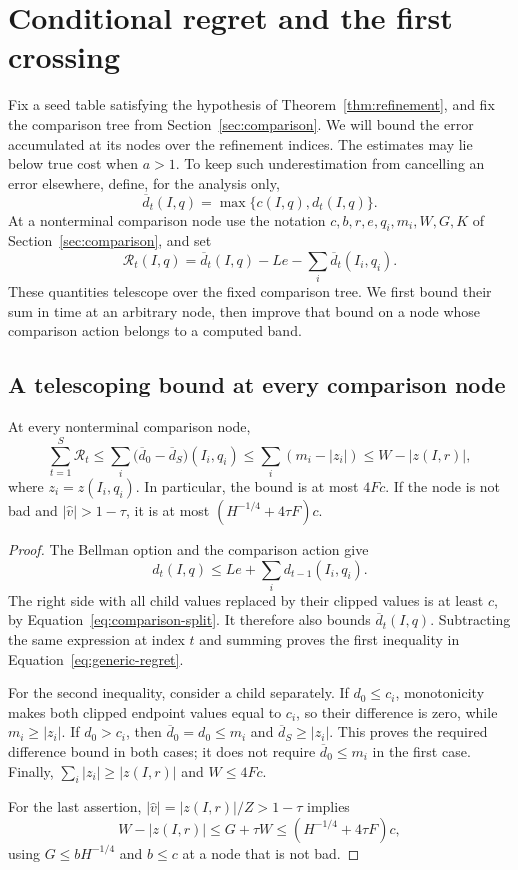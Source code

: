 \section{Conditional regret and the first crossing}\label{sec:regret}

Fix a seed table satisfying the hypothesis of Theorem~\ref{thm:refinement},
and fix the comparison tree from Section~\ref{sec:comparison}.
We will bound the error accumulated at its nodes over the refinement indices.
The estimates may lie below true cost when $a>1$. To keep such
underestimation from cancelling an error elsewhere, define, for the analysis
only,
\[
 \overline d_t(I,q)=\max\{c(I,q),d_t(I,q)\}.
\]
At a nonterminal comparison node use the notation
$c,b,r,e,q_i,m_i,W,G,K$ of Section~\ref{sec:comparison}, and set
\begin{equation}\label{eq:node-regret-definition}
 \mathcal R_t(I,q)
 =\overline d_t(I,q)-Le-\sum_i\overline d_t(I_i,q_i).
\end{equation}
These quantities telescope over the fixed comparison tree. We first bound
their sum in time at an arbitrary node, then improve that bound on a node
whose comparison action belongs to a computed band.

\subsection{A telescoping bound at every comparison node}

\begin{lemma}\label{lem:generic-regret}
At every nonterminal comparison node,
\begin{equation}\label{eq:generic-regret}
 \sum_{t=1}^S\mathcal R_t
 \le \sum_i\bigl(\overline d_0-\overline d_S\bigr)(I_i,q_i)
 \le \sum_i(m_i-|z_i|)
 \le W-|z(I,r)|,
\end{equation}
where $z_i=z(I_i,q_i)$. In particular, the bound is at most $4Fc$.
If the node is not bad and $|\widehat v|>1-\tau$, it is at most
$(H^{-1/4}+4\tau F)c$.
\end{lemma}

\begin{proof}
The Bellman option and the comparison action give
\[
 d_t(I,q)\le Le+\sum_i d_{t-1}(I_i,q_i).
\]
The right side with all child values replaced by their clipped values is
at least $c$, by Equation~\ref{eq:comparison-split}. It therefore also bounds
$\overline d_t(I,q)$. Subtracting the same expression at index $t$ and
summing proves the first inequality in Equation~\ref{eq:generic-regret}.

For the second inequality, consider a child separately. If $d_0\le c_i$,
monotonicity makes both clipped endpoint values equal to $c_i$, so their
difference is zero, while $m_i\ge |z_i|$. If $d_0>c_i$, then
$\overline d_0=d_0\le m_i$ and $\overline d_S\ge |z_i|$. This proves the
required difference bound in both cases; it does not require
$\overline d_0\le m_i$ in the first case. Finally,
$\sum_i|z_i|\ge|z(I,r)|$ and $W\le4Fc$.

For the last assertion, $|\widehat v|=|z(I,r)|/Z>1-\tau$ implies
\[
 W-|z(I,r)|\le G+\tau W
 \le (H^{-1/4}+4\tau F)c,
\]
using $G\le bH^{-1/4}$ and $b\le c$ at a node that is not bad.
\end{proof}

